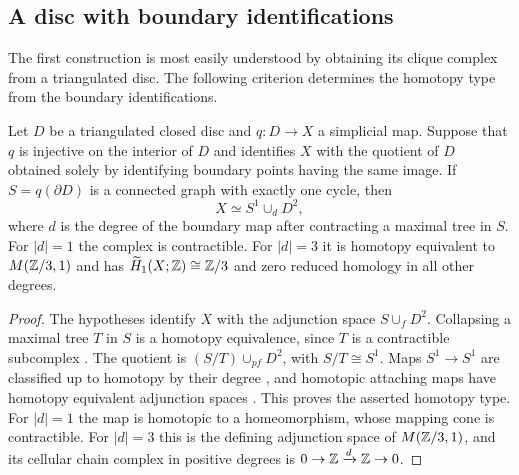 \subsection{A disc with boundary identifications}\label{sec:discs}
The first construction is most easily understood by obtaining its
clique complex from a triangulated disc. The following criterion
determines the homotopy type from the boundary identifications.

\begin{proposition}\label{prop:disc}
Let $D$ be a triangulated closed disc and $q:D\to X$ a simplicial
map. Suppose that $q$ is injective on the interior of $D$ and identifies
$X$ with the quotient of $D$ obtained solely by identifying boundary
points having the same image. If $S=q(\partial D)$ is a connected
graph with exactly one cycle, then
\[
 X\simeq S^1\cup_d D^2,
\]
where $d$ is the degree of the boundary map after contracting a maximal
tree in $S$. For $|d|=1$ the complex is contractible. For $|d|=3$
it is homotopy equivalent to $M(\mathbb Z/3,1)$ and has
$\widetilde H_1(X;\mathbb Z)\cong\mathbb Z/3$ and zero reduced homology in all
other degrees.
\end{proposition}
\begin{proof}
The hypotheses identify $X$ with the adjunction space $S\cup_fD^2$.
Collapsing a maximal tree $T$ in $S$ is a homotopy equivalence, since
$T$ is a contractible subcomplex \cite[Propositions~0.16--0.17]{Hatcher2002}.
The quotient is $(S/T)\cup_{pf}D^2$, with $S/T\cong S^1$.
Maps $S^1\to S^1$ are classified up to homotopy by their degree
\cite[Theorem~1.7]{Hatcher2002}, and homotopic attaching maps have
homotopy equivalent adjunction spaces
\cite[Proposition~0.18]{Hatcher2002}. This proves the asserted
homotopy type. For $|d|=1$ the map is homotopic to a homeomorphism,
whose mapping cone is contractible. For $|d|=3$ this is the defining
adjunction space of $M(\mathbb Z/3,1)$, and its cellular chain complex in
positive degrees is $0\to\mathbb Z\xrightarrow{d}\mathbb Z\to0$.
\end{proof}
